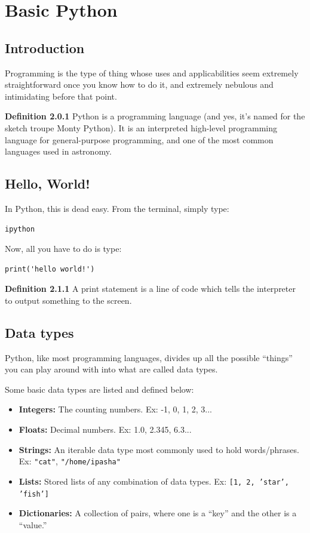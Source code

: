\chapter{Basic Python} %

\section{Introduction} %
Programming is the type of thing whose uses and applicabilities seem extremely straightforward once you know how to do it, and extremely nebulous and intimidating before that point. %

\textbf{Definition 2.0.1} Python is a programming language (and yes, it's named for the sketch troupe Monty Python). It is an interpreted high-level programming language for general-purpose programming, and one of the most common languages used in astronomy. %

\section{Hello, World!} %
In Python, this is dead easy. From the terminal, simply type: %

\begin{lstlisting}
ipython
\end{lstlisting} %

Now, all you have to do is type: %

\begin{lstlisting}
print('hello world!')
\end{lstlisting} %

\textbf{Definition 2.1.1} A print statement is a line of code which tells the interpreter to output something to the screen. %

\section{Data types} %
Python, like most programming languages, divides up all the possible ``things'' you can play around with into what are called data types. %

Some basic data types are listed and defined below: %
\begin{itemize}
    \item \textbf{Integers:} The counting numbers. Ex: -1, 0, 1, 2, 3... %
    \item \textbf{Floats:} Decimal numbers. Ex: 1.0, 2.345, 6.3... %
    \item \textbf{Strings:} An iterable data type most commonly used to hold words/phrases. Ex: \texttt{"cat"}, \texttt{"/home/ipasha"} %
    \item \textbf{Lists:} Stored lists of any combination of data types. Ex: \texttt{[1, 2, 'star', 'fish']} %
    \item \textbf{Dictionaries:} A collection of pairs, where one is a ``key'' and the other is a ``value.'' %
\end{itemize}

